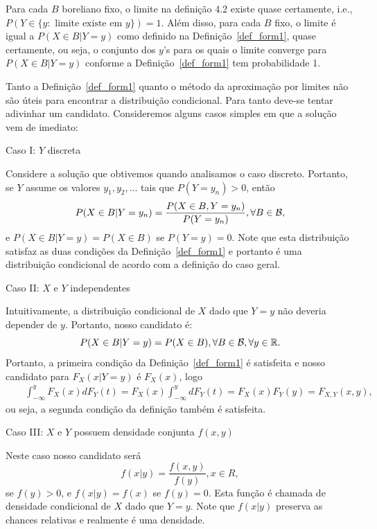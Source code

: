 \begin{frame}
\begin{theorem}
Para cada $B$ boreliano fixo, o limite na definição 4.2 existe quase
certamente, i.e., $P(Y\in \{y:\mbox{ limite existe em }y\})=1$. Além
disso, para cada $B$ fixo, o limite é igual a $P(X\in B|Y=y)$ como
definido na Definição~\ref{def_form1}, quase certamente, ou seja, o conjunto dos
$y$'s para os quais o limite converge para $P(X\in B|Y=y)$ conforme a Definição~\ref{def_form1} tem probabilidade 1.
\end{theorem}

Tanto a Definição~\ref{def_form1} quanto o método da aproximação por limites não são úteis para
encontrar a distribuição condicional. Para tanto deve-se tentar
adivinhar um candidato. Consideremos alguns casos simples em que a solução vem de imediato:

\begin{block}{Caso I: $Y$ discreta}

Considere a solução que obtivemos quando analisamos o caso discreto. Portanto, se $Y$ assume os valores $y_1,y_2,\ldots$ tais que
$P(Y=y_n)>0$, então
$$P(X\in B|Y=y_n)=\frac{P(X\in B,Y=y_n)}{P(Y=y_n)}, \forall B\in{\cal B},$$
e $P(X\in B|Y=y)=P(X\in B)$ se $P(Y=y)=0$. Note que esta distribuição satisfaz as duas condições da Definição~\ref{def_form1} e portanto é uma distribuição condicional de acordo com a definição do caso geral.

\end{block}
\end{frame}

\begin{frame}
\begin{block}{Caso II: $X$ e $Y$ independentes}

Intuitivamente, a distribuição condicional de $X$ dado que $Y=y$ não deveria depender de $y$. Portanto, nosso candidato é:
$$P(X\in B|Y=y)=P(X\in B), \forall B\in {\cal B},\forall y\in\mathbb{R}.$$
Portanto, a primeira condição da Definição~\ref{def_form1} é satisfeita e nosso candidato para $F_X(x|Y=y)$ é $F_X(x)$, logo
\begin{eqnarray}
& & \int_{-\infty}^{y}F_X(x)dF_Y(t)=F_X(x)\int_{-\infty}^{y}dF_Y(t)=F_X(x)F_Y(y)=F_{X,Y}(x,y),\nonumber
\end{eqnarray}
ou seja, a segunda condição da definição também é satisfeita.
\end{block}

\begin{block}{Caso III: $X$ e $Y$ possuem densidade conjunta $f(x,y)$}

Neste caso nosso candidato será
$$f(x|y)=\frac{f(x,y)}{f(y)}, x\in R,$$
se $f(y)>0$, e $f(x|y)=f(x)$ se $f(y)=0$. Esta função é chamada de
densidade condicional de $X$ dado que $Y=y$. Note que $f(x|y)$
preserva as chances relativas e realmente é uma densidade. 

\end{block}
\end{frame}

